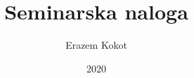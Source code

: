 \documentclass[12pt,a4paper]{article}
\title{Seminarska naloga}
\author{Erazem Kokot}
\date{2020}
\begin{document}
    \begin{titlepage}
        \maketitle
    \end{titlepage}

    
    
    
    
    
    
    
    
\end{document}
